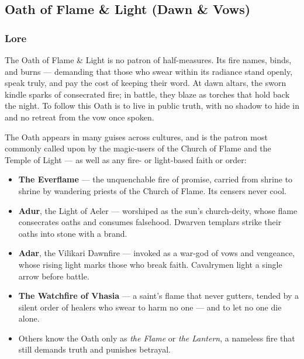 
\subsection{Oath of Flame \& Light (Dawn \& Vows)}

\subsubsection*{Lore}
The Oath of Flame \& Light is no patron of half-measures. Its fire names, binds, and burns --- demanding that those who swear within its radiance stand openly, speak truly, and pay the cost of keeping their word. At dawn altars, the sworn kindle sparks of consecrated fire; in battle, they blaze as torches that hold back the night. To follow this Oath is to live in public truth, with no shadow to hide in and no retreat from the vow once spoken.

The Oath appears in many guises across cultures, and is the patron most commonly called upon by the magic-users of the Church of Flame and the Temple of Light --- as well as any fire- or light-based faith or order:
\begin{itemize}
  \item \textbf{The Everflame} --- the unquenchable fire of promise, carried from shrine to shrine by wandering priests of the Church of Flame. Its censers never cool.
  \item \textbf{Adur}, the Light of Aeler --- worshiped as the sun's church-deity, whose flame consecrates oaths and consumes falsehood. Dwarven templars strike their oaths into stone with a brand.
  \item \textbf{Adar}, the Vilikari Dawnfire --- invoked as a war-god of vows and vengeance, whose rising light marks those who break faith. Cavalrymen light a single arrow before battle.
  \item \textbf{The Watchfire of Vhasia} --- a saint's flame that never gutters, tended by a silent order of healers who swear to harm no one --- and to let no one die alone.
  \item Others know the Oath only as \textit{the Flame} or \textit{the Lantern}, a nameless fire that still demands truth and punishes betrayal.
\end{itemize}

